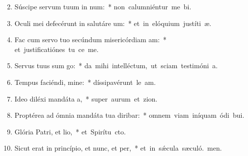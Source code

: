\begin{flushleft}
\begin{enumerate}[leftmargin=*]
\setcounter{enumi}{1}

\item Súscipe servum tuum in num:~* \mbox{non calumniéntur me bi.}
\item Oculi mei defecérunt in salutáre um:~* \mbox{et in elóquium justíti æ.}
\item Fac cum servo tuo secúndum misericórdiam am:~* \mbox{et justificatiónes tu ce me.}
\item Servus tuus sum go:~* \mbox{da mihi intelléctum, ut sciam testimóni a.}
\item Tempus faciéndi, mine:~* \mbox{díssipavérunt le am.}
\item Ideo diléxi mandáta a,~* \mbox{super aurum et zion.}
\item Proptérea ad ómnia mandáta tua diribar:~* \mbox{omnem viam iníquam ódi bui.}
\item Glória Patri, et lio,~* \mbox{et Spirítu cto.}
\item Sicut erat in princípio, et nunc, et per,~* \mbox{et in s\'{\ae}cula sæculó. men.}

\end{enumerate}
\end{flushleft}


